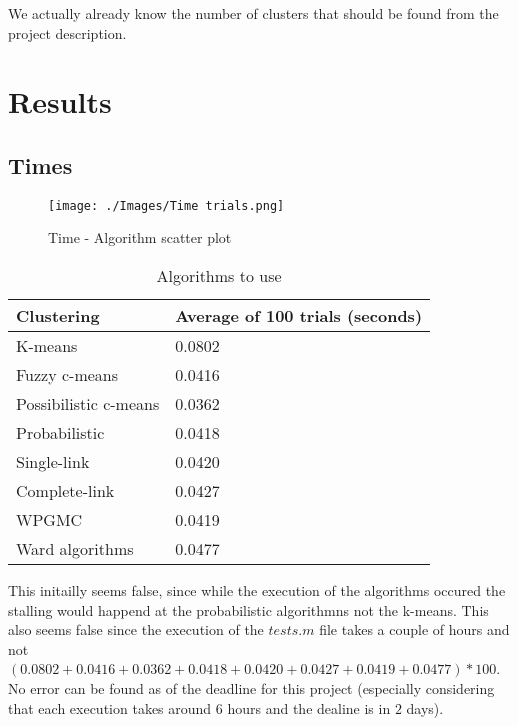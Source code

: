 \documentclass[12pt, a4paper]{article}
\begin{document}
We actually already know the number of clusters that should be found from the project description.%

\section{Results}

\subsection{Times}

\begin{figure}[H]
    \begin{center}
        \texttt{[image: ./Images/Time trials.png]}
    \end{center}
    \caption{Time - Algorithm scatter plot}\label{fig:Times}
\end{figure}

\begin{table}[H]
    \caption{Algorithms to use}\label{tab:Times}
    \begin{center}
        \begin{tabular}{l|l}
            \hline
            \textbf{Clustering} & \textbf{Average of 100 trials (seconds)} \\
            \hline
                K-means & 0.0802 \\
                Fuzzy c-means & 0.0416 \\
                Possibilistic c-means & 0.0362 \\
                Probabilistic & 0.0418 \\
                Single-link & 0.0420 \\
                Complete-link & 0.0427 \\
                WPGMC & 0.0419 \\
                Ward algorithms & 0.0477 \\
            \hline
        \end{tabular}
    \end{center}
\end{table}

This initailly seems false, since while the execution of the algorithms occured the stalling would happend at the probabilistic algorithmns not the k-means. This also seems false since the execution of the $tests.m$ file takes a couple of hours and not $(0.0802 + 0.0416 + 0.0362 + 0.0418 + 0.0420 + 0.0427 + 0.0419 + 0.0477) * 100$. No error can be found as of the deadline for this project (especially considering that each execution takes around $6$ hours and the dealine is in $2$ days).
\newline
\end{document}

